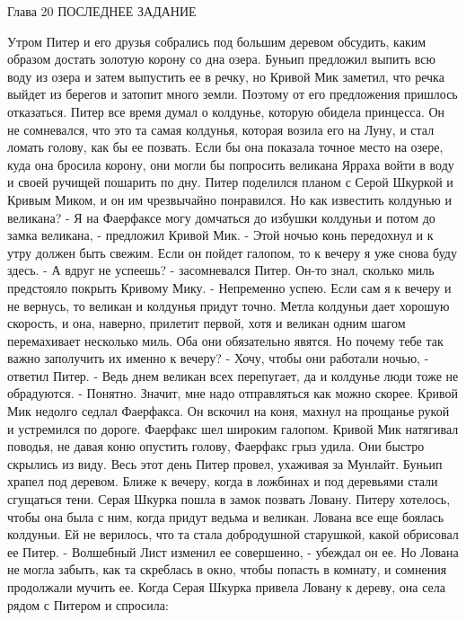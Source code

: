 Глава 20
        ПОСЛЕДНЕЕ ЗАДАНИЕ

    Утром Питер и его друзья собрались под большим деревом обсудить, 
каким образом достать золотую корону со дна озера.
    Буньип предложил выпить всю воду из озера и затем выпустить ее в 
речку, но Кривой Мик заметил, что речка выйдет из берегов и затопит 
много земли. Поэтому от его предложения пришлось отказаться.
    Питер все время думал о колдунье, которую обидела принцесса. Он не 
сомневался, что это та самая колдунья, которая возила его на Луну, и 
стал ломать голову, как бы ее позвать. Если бы она показала точное 
место на озере, куда она бросила корону, они могли бы попросить 
великана Ярраха войти в воду и своей ручищей пошарить по дну.
    Питер поделился планом с Серой Шкуркой и Кривым Миком, и он им 
чрезвычайно понравился. Но как известить колдунью и великана?
    - Я на Фаерфаксе могу домчаться до избушки колдуньи и потом до 
замка великана, - предложил Кривой Мик. - Этой ночью конь передохнул и 
к утру должен быть свежим. Если он пойдет галопом, то к вечеру я уже 
снова буду здесь.
    - А вдруг не успеешь? - засомневался Питер. Он-то знал, сколько 
миль предстояло покрыть Кривому Мику.
    - Непременно успею. Если сам я к вечеру и не вернусь, то великан и 
колдунья придут точно. Метла колдуньи дает хорошую скорость, и она, 
наверно, прилетит первой, хотя и великан одним шагом перемахивает 
несколько миль. Оба они обязательно явятся. Но почему тебе так важно 
заполучить их именно к вечеру?
    - Хочу, чтобы они работали ночью, - ответил Питер. - Ведь днем 
великан всех перепугает, да и колдунье люди тоже не обрадуются.
    - Понятно. Значит, мне надо отправляться как можно скорее.
    Кривой Мик недолго седлал Фаерфакса. Он вскочил на коня, махнул на 
прощанье рукой и устремился по дороге. Фаерфакс шел широким галопом. 
Кривой Мик натягивал поводья, не давая коню опустить голову, Фаерфакс 
грыз удила. Они быстро скрылись из виду.
    Весь этот день Питер провел, ухаживая за Мунлайт. Буньип храпел 
под деревом. Ближе к вечеру, когда в ложбинах и под деревьями стали 
сгущаться тени. Серая Шкурка пошла в замок позвать Ловану. Питеру 
хотелось, чтобы она была с ним, когда придут ведьма и великан.
    Лована все еще боялась колдуньи. Ей не верилось, что та стала 
добродушной старушкой, какой обрисовал ее Питер.
    - Волшебный Лист изменил ее совершенно, - убеждал он ее.
    Но Лована не могла забыть, как та скреблась в окно, чтобы попасть 
в комнату, и сомнения продолжали мучить ее.
    Когда Серая Шкурка привела Ловану к дереву, она села рядом с 
Питером и спросила:
